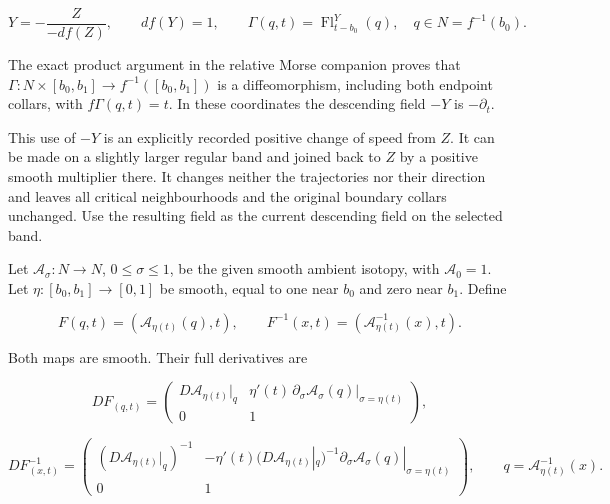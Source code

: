 \begin{equation}
Y=-\frac{Z}{-df(Z)},\qquad df(Y)=1,
 \qquad
 \Gamma(q,t)=\operatorname{Fl}^{Y}_{t-b_0}(q),
 \quad q\in N=f^{-1}(b_0).
 \label{courseIII:morse-trajectories-and-critical-value-lowering:eq:1.1}
\end{equation}

The exact product argument in the relative Morse companion proves that \(\Gamma:N\times[b_0,b_1]\to f^{-1}([b_0,b_1])\) is a diffeomorphism, including both endpoint collars, with \(f\Gamma(q,t)=t\). In these coordinates the descending field \(-Y\) is \(-\partial_t\).

This use of \(-Y\) is an explicitly recorded positive change of speed from \(Z\). It can be made on a slightly larger regular band and joined back to \(Z\) by a positive smooth multiplier there. It changes neither the trajectories nor their direction and leaves all critical neighbourhoods and the original boundary collars unchanged. Use the resulting field as the current descending field on the selected band.

Let \(\mathcal A_\sigma:N\to N\), \(0\leq\sigma\leq1\), be the given smooth ambient isotopy, with \(\mathcal A_0=1\). Let \(\eta:[b_0,b_1]\to[0,1]\) be smooth, equal to one near \(b_0\) and zero near \(b_1\). Define

\begin{equation}
F(q,t)=(\mathcal A_{\eta(t)}(q),t),\qquad
 F^{-1}(x,t)=(\mathcal A_{\eta(t)}^{-1}(x),t).
 \label{courseIII:morse-trajectories-and-critical-value-lowering:eq:1.2}
\end{equation}

Both maps are smooth. Their full derivatives are

\begin{equation}
DF_{(q,t)}=
 \begin{pmatrix}
 D\mathcal A_{\eta(t)}|_q&
 \eta'(t)\,\partial_\sigma\mathcal A_\sigma(q)|_{\sigma=\eta(t)}\\
 0&1
 \end{pmatrix},
 \label{courseIII:morse-trajectories-and-critical-value-lowering:eq:1.3}
\end{equation}

\begin{equation}
DF^{-1}_{(x,t)}=
 \begin{pmatrix}
 (D\mathcal A_{\eta(t)}|_q)^{-1}&
 -\eta'(t)(D\mathcal A_{\eta(t)}|_q)^{-1}
       \partial_\sigma\mathcal A_\sigma(q)|_{\sigma=\eta(t)}\\
 0&1
 \end{pmatrix},
 \qquad q=\mathcal A_{\eta(t)}^{-1}(x).
 \label{courseIII:morse-trajectories-and-critical-value-lowering:eq:1.4}
\end{equation}

